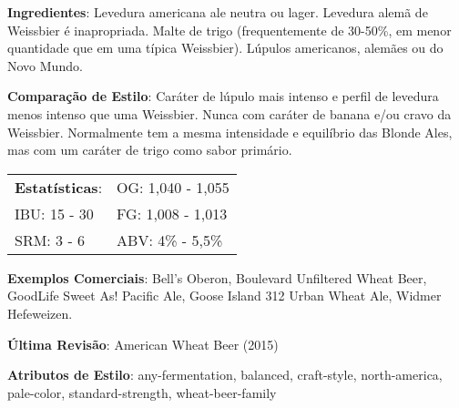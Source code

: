 \textbf{Ingredientes}: Levedura americana ale neutra ou lager. Levedura alemã de Weissbier é inapropriada. Malte de trigo (frequentemente de 30-50\%, em menor quantidade que em uma típica Weissbier). Lúpulos americanos, alemães ou do Novo Mundo.

\textbf{Comparação de Estilo}: Caráter de lúpulo mais intenso e perfil de levedura menos intenso que uma Weissbier. Nunca com caráter de banana e/ou cravo da Weissbier. Normalmente tem a mesma intensidade e equilíbrio das Blonde Ales, mas com um caráter de trigo como sabor primário.

\begin{tabular}{@{}p{35mm}p{35mm}@{}}
  \textbf{Estatísticas}: & OG: 1,040 - 1,055 \\
  IBU: 15 - 30  & FG: 1,008 - 1,013 \\
  SRM: 3 - 6  & ABV: 4\% - 5,5\%
\end{tabular}

\textbf{Exemplos Comerciais}: Bell’s Oberon, Boulevard Unfiltered Wheat Beer, GoodLife Sweet As! Pacific Ale, Goose Island 312 Urban Wheat Ale, Widmer Hefeweizen.

\textbf{Última Revisão}: American Wheat Beer (2015)

\textbf{Atributos de Estilo}: any-fermentation, balanced, craft-style, north-america, pale-color, standard-strength, wheat-beer-family
